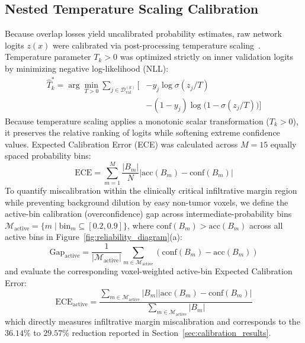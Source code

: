 \documentclass[11pt,a4paper]{article}
\begin{document}
\subsection{Nested Temperature Scaling Calibration}
Because overlap losses yield uncalibrated probability estimates, raw network logits $z(x)$ were calibrated via post-processing temperature scaling~\cite{guo2017calibration}. Temperature parameter $T_k > 0$ was optimized strictly on inner validation logits by minimizing negative log-likelihood (NLL):
\begin{equation}
\begin{aligned}
\hat{T}_k^* = \arg\min_{T > 0} \sum_{j \in \mathcal{D}_{\text{val}}^{(k)}} \Big[ &-y_j \log \sigma(z_j / T) \\
&-(1 - y_j) \log \big(1 - \sigma(z_j / T)\big) \Big]
\end{aligned}
\end{equation}
Because temperature scaling applies a monotonic scalar transformation ($T_k > 0$), it preserves the relative ranking of logits while softening extreme confidence values. Expected Calibration Error (ECE) was calculated across $M = 15$ equally spaced probability bins:
\begin{equation}
\text{ECE} = \sum_{m=1}^M \frac{|B_m|}{N} \left| \text{acc}(B_m) - \text{conf}(B_m) \right|
\end{equation}
To quantify miscalibration within the clinically critical infiltrative margin region while preventing background dilution by easy non-tumor voxels, we define the active-bin calibration (overconfidence) gap across intermediate-probability bins $\mathcal{M}_{\text{active}} = \{m \mid \text{bin}_m \subseteq [0.2, 0.9]\}$, where $\text{conf}(B_m) > \text{acc}(B_m)$ across all active bins in Figure~\ref{fig:reliability_diagram}(a):
\begin{equation}
\text{Gap}_{\text{active}} = \frac{1}{|\mathcal{M}_{\text{active}}|} \sum_{m \in \mathcal{M}_{\text{active}}} \left( \text{conf}(B_m) - \text{acc}(B_m) \right)
\end{equation}
and evaluate the corresponding voxel-weighted active-bin Expected Calibration Error:
\begin{equation}
\text{ECE}_{\text{active}} = \frac{\sum_{m \in \mathcal{M}_{\text{active}}} |B_m| \left| \text{acc}(B_m) - \text{conf}(B_m) \right|}{\sum_{m \in \mathcal{M}_{\text{active}}} |B_m|}
\end{equation}
which directly measures infiltrative margin miscalibration and corresponds to the $36.14\%$ to $29.57\%$ reduction reported in Section~\ref{sec:calibration_results}.
\end{document}

